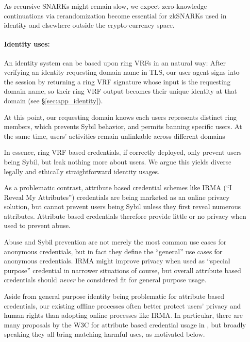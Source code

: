As recursive SNARKs might remain slow,
we expect zero-knowledge continuations via rerandomization become
essential for zkSNARKs used in identity and elsewhere outside the crypto-currency space.

\paragraph{Identity uses:}

An identity system can be based upon ring VRFs in an natural way:
After verifying an identity requesting domain name in TLS,
our user agent signs into the session by returning a ring VRF
signature whose input is the requesting domain name, so their
ring VRF output becomes their unique identity at that domain
(see \S\ref{sec:app_identity}).

At this point, our requesting domain knows each users represents
distinct ring members, which prevents Sybil behavior, and permits
banning specific users.
At the same time, users' activities remain unlinkable across different
domains

In essence, ring VRF based credentials, if correctly deployed, only
prevent users being Sybil, but leak nothing more about users.  We argue
this yields diverse legally and ethically straightforward identity usages.

As a problematic contrast, attribute based credential schemes like
IRMA (``I Reveal My Attributes'') credentials \cite{IRMAcredentials}
are being marketed as an online privacy solution, but cannot prevent
users being Sybil unless they first reveal numerous attributes.
Attribute based credentials therefore provide little or no privacy
when used to prevent abuse.

Abuse and Sybil prevention are not merely the most common use cases for
anonymous credentials, but in fact they define the ``general'' use cases for
anonymous credentials.
IRMA might improve privacy when used as ``special purpose'' credential 
in narrower situations of course, but overall attribute based credentials
should {\it never} be considered fit for general purpose usage.

Aside from general purpose identity being problematic for attribute based
credentials, our existing offline processes often better protect users'
privacy and human rights than adopting online processes like IRMA.
%
In particular, there are many proposals by the W3C for attribute based
credential usage in \cite{w3c_vc_use_cases}, but broadly speaking they
all bring matching harmful uses, as motivated below.  %

